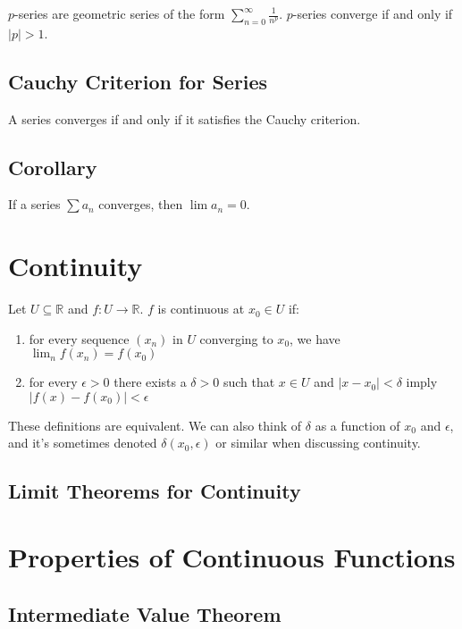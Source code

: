 \documentclass[12pt]{article}
\newcommand{\R}{\mathbb{R}}
\begin{document}
$p$-series are geometric series of the form $\sum_{n=0}^\infty \frac{1}{n^p}$. $p$-series converge if and only if $|p| > 1$.

\subsection{Cauchy Criterion for Series}



A series converges if and only if it satisfies the Cauchy criterion.

\subsection{Corollary}

If a series $\sum a_n$ converges, then $\lim a_n = 0$.

\section{Continuity}

Let $U \subseteq \R$ and $f : U \to \R$. $f$ is continuous at $x_0 \in U$ if: \begin{enumerate}
\item for every sequence $(x_n)$ in $U$ converging to $x_0$, we have $\lim_n f(x_n) = f(x_0)$

\item for every $\epsilon > 0$ there exists a $\delta > 0$ such that $x \in U$ and $|x - x_0| < \delta$ imply $|f(x) - f(x_0)| < \epsilon$
\end{enumerate} These definitions are equivalent. We can also think of $\delta$ as a function of $x_0$ and $\epsilon$, and it's sometimes denoted $\delta(x_0, \epsilon)$ or similar when discussing continuity.

\subsection{Limit Theorems for Continuity}

\section{Properties of Continuous Functions}

\subsection{Intermediate Value Theorem}
\end{document}
